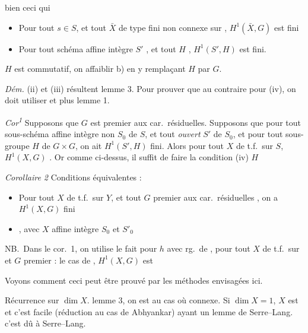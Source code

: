 \documentclass[11pt,a4paper]{article}
\begin{document}
 \ill{} bien ceci qui \ill{}

\begin{itemize}
\item[(iv) a)] Pour tout $s \in S$, et tout  $\bar X$ de
\ill{} type fini non  connexe sur \ill{},
$H^1(\bar X, G)$ est fini

\item[b)] Pour tout \struck{\ill{}} schéma affine intègre $S'$
\struck{\ill{}} , et tout \ill{} $H$ \ill{},
$H^1(S', H)$ est fini.
\end{itemize}

 $H$ est commutatif, on \ill{} affaiblir b) en y remplaçant
$H$ par $G$.

\emph{Dém.} \ill{} (ii) et (iii) résultent  \ill{} lemme
3. Pour prouver que \ill{} au contraire pour (iv), on doit utiliser \ill{} et
plus lemme 1.

\emph{Cor\textsuperscript{1}} Supposons que $G$ est premier aux car.\
résiduelles.  \struck{\ill{}} Supposons que pour tout
sous-schéma affine intègre non \ill{} $S_0$ de $S$, et tout \emph{ouvert}
\uncertain{dense} $S'$ de $S_0$, et pour tout \struck{\ill{}} sous-groupe $H$
de $G \times G$, on ait $H^1(S', H)$ fini. Alors pour tout $X$ de t.f.\ sur
$S$, $H^1(X, G)$ \ill{}. Or comme \ill{} ci-dessus, il suffit de faire \ill{}
la condition (iv) \ill{} $H$ \ill{}

\emph{Corollaire 2} Conditions équivalentes :

\begin{itemize}
\item[(i)] Pour tout $X$ de t.f.\ sur $Y$, et tout  $G$ premier
aux car.\ résiduelles \ill{}, on a $H^1(X, G)$ fini

\item[(ii)] \struck{\ill{}} , avec $X$ \ill{} \ill{} affine
intègre $S_0$ et $S'_0$ \ill{}
\end{itemize}

NB.\ Dans le cor.\ 1, \ill{} on utilise le fait \ill{} pour \ill{} $h$ \ill{}
avec rg.\ de \ill{}, \ill{} pour tout $X$ de t.f.\ sur \ill{} et $G$ premier :
le cas de \ill{}, $H^1(X, G)$ est \ill{}

Voyons comment ceci peut être prouvé par les méthodes envisagées ici.


\struck{\ill{}} Récurrence sur $\dim X$. \struck{\ill{}} \ill{} lemme 3, on
est \uncertain{ramené} au cas où \ill{} connexe. Si $\dim X = 1$, $X$ est
\uncertain{lisse} et \struck{\ill{}} \ill{} \struck{projectif} c'est facile
(réduction au cas de Abhyankar) \ill{} ayant un lemme de Serre--Lang.
\struck{\ill{}} c'est dû à \ill{} Serre--Lang.
\end{document}
